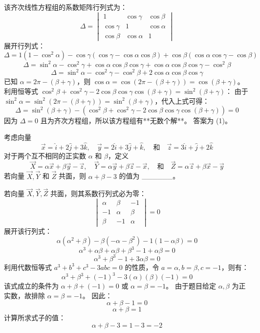 \begin{questions}
\begin{solution}
该齐次线性方程组的系数矩阵行列式为：
\[
\Delta = \begin{vmatrix} 1 & \cos \gamma & \cos \beta \\ \cos \gamma & 1 & \cos \alpha \\ \cos \beta & \cos \alpha & 1 \end{vmatrix}
\]
展开行列式：
\[
\Delta = 1(1 - \cos^2 \alpha) - \cos \gamma(\cos \gamma - \cos \alpha \cos \beta) + \cos \beta(\cos \alpha \cos \gamma - \cos \beta)
\]
\[
\Delta = \sin^2 \alpha - \cos^2 \gamma + \cos \alpha \cos \beta \cos \gamma + \cos \alpha \cos \beta \cos \gamma - \cos^2 \beta
\]
\[
\Delta = \sin^2 \alpha - \cos^2 \gamma - \cos^2 \beta + 2 \cos \alpha \cos \beta \cos \gamma
\]
已知 $\alpha = 2\pi - (\beta + \gamma)$，则 $\cos \alpha = \cos(2\pi - (\beta + \gamma)) = \cos(\beta + \gamma)$。
利用恒等式 $\cos^2 \beta + \cos^2 \gamma - 2 \cos \beta \cos \gamma \cos(\beta + \gamma) = \sin^2(\beta + \gamma)$：
由于 $\sin^2 \alpha = \sin^2(2\pi - (\beta + \gamma)) = \sin^2(\beta + \gamma)$，代入上式可得：
\[
\Delta = \sin^2(\beta + \gamma) - (\cos^2 \beta + \cos^2 \gamma - 2 \cos \beta \cos \gamma \cos(\beta + \gamma)) = 0
\]
因为 $\Delta = 0$ 且为齐次方程组，所以该方程组有**无数个解**。
答案为 (1)。
\end{solution}

    \question
考虑向量
\[
\vec{x} = \hat{i} + 2\hat{j} + 3\hat{k} , \quad \vec{y} = 2\hat{i} + 3\hat{j} + \hat{k} , \quad \text{和} \quad \vec{z} = 3\hat{i} + \hat{j} + 2\hat{k}
\]
对于两个互不相同的正实数 $\alpha$ 和 $\beta$，定义
\[
\vec{X} = \alpha\vec{x} + \beta\vec{y} - \vec{z} , \quad \vec{Y} = \alpha\vec{y} + \beta\vec{z} - \vec{x} , \quad \text{和} \quad \vec{Z} = \alpha\vec{z} + \beta\vec{x} - \vec{y}
\]
若向量 $\vec{X}, \vec{Y}$ 和 $\vec{Z}$ 共面，则 $\alpha + \beta - 3$ 的值为 \_\_\_\_\_\_。

\begin{solution}
若向量 $\vec{X}, \vec{Y}, \vec{Z}$ 共面，则其系数行列式必为零：
\[
\begin{vmatrix} \alpha & \beta & -1 \\ -1 & \alpha & \beta \\ \beta & -1 & \alpha \end{vmatrix} = 0
\]
展开该行列式：
\[
\alpha(\alpha^2 + \beta) - \beta(-\alpha - \beta^2) - 1(1 - \alpha\beta) = 0
\]
\[
\alpha^3 + \alpha\beta + \alpha\beta + \beta^3 - 1 + \alpha\beta = 0
\]
\[
\alpha^3 + \beta^3 - 1 + 3\alpha\beta = 0
\]
利用代数恒等式 $a^3 + b^3 + c^3 - 3abc = 0$ 的性质，令 $a = \alpha, b = \beta, c = -1$，则有：
\[
\alpha^3 + \beta^3 + (-1)^3 - 3(\alpha)(\beta)(-1) = 0
\]
该式成立的条件为 $\alpha + \beta + (-1) = 0$ 或 $\alpha = \beta = -1$。
由于题目给定 $\alpha, \beta$ 为正实数，故排除 $\alpha = \beta = -1$。
因此：
\[
\alpha + \beta - 1 = 0
\]
\[
\alpha + \beta = 1
\]
计算所求式子的值：
\[
\alpha + \beta - 3 = 1 - 3 = -2
\]
\end{solution}


\end{questions}
